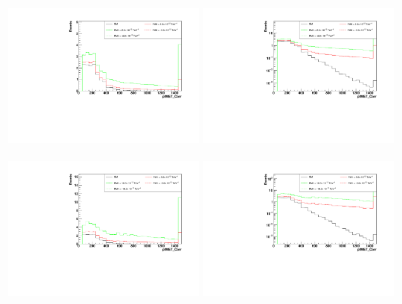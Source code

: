 \begin{figure}[h]
  \begin{center}
	\includegraphics[width=0.45\textwidth]{Plots/aQGC_kinematics/pfMET_Corr_FM0.pdf}%
	\includegraphics[width=0.45\textwidth]{Plots/aQGC_kinematics/pfMET_Corr_FM0_log.pdf}\\				
    \caption{}
  \end{center}
\end{figure}
\begin{figure}[h]
  \begin{center}
	\includegraphics[width=0.45\textwidth]{Plots/aQGC_kinematics/pfMET_Corr_FM1.pdf}%
	\includegraphics[width=0.45\textwidth]{Plots/aQGC_kinematics/pfMET_Corr_FM1_log.pdf}\\				
    \caption{}
  \end{center}
\end{figure}
